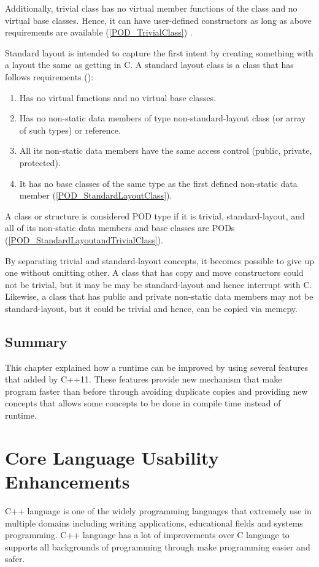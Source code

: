 \documentclass[11pt]{report}
\begin{document}
Additionally, trivial class has no virtual member functions of the class and no virtual base classes. Hence, it can have user-defined constructors as long as above requirements are available (\ref{POD_TrivialClass}) \cite{ISO:2011:Cpplanguage}.

Standard layout is intended to capture the first intent by creating something with a layout the same as getting in C. A standard layout class is a class that has follows requirements (\cite{ISO:2011:Cpplanguage}):

\begin{enumerate}
\item	Has no virtual functions and no virtual base classes.
\item	Has no non-static data members of type non-standard-layout class (or array of such types) or reference.
\item	All its non-static data members have the same access control (public, private, protected).
\item	It has no base classes of the same type as the first defined non-static data member (\ref{POD_StandardLayoutClass}).
\end{enumerate}

A class or structure is considered POD type if it is trivial, standard-layout, and all of its non-static data members and base classes are PODs (\ref{POD_StandardLayoutandTrivialClass}).

By separating trivial and standard-layout concepts, it becomes possible to give up one without omitting other. A class that has copy  and move constructors could not be trivial, but it may be may be standard-layout and hence interrupt with C. Likewise, a class that has  public and private non-static data members may not be standard-layout, but it could be trivial and hence, can be copied via memcpy.

\section{Summary}
\label{sec: Summary}
This chapter explained how a runtime can be improved by using several features that added by C++11.  These features provide new mechanism that make program faster than before through avoiding duplicate copies and providing new concepts that allows some concepts to be done in compile time instead of runtime.

\chapter{Core Language Usability Enhancements}
\label{chapter: Usability Enhancements}
C++ language is one of the widely programming languages that extremely use in multiple domains including writing applications, educational fields and systems programming. C++ language has a lot of improvements over C language to supports all backgrounds of programming through make programming easier and safer.
\end{document}
